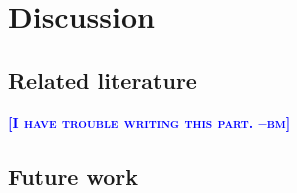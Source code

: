 \documentclass{article} %
\newcommand{\bmcomment}[1]{\textcolor{blue}{\textsc{\textbf{[#1 --bm]}}}}
\begin{document}



\section{Discussion}

\subsection{Related literature}

\bmcomment{I have trouble writing this part.}

\subsection{Future work}
\end{document}
